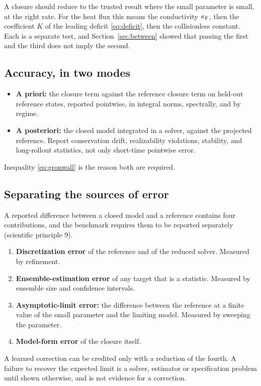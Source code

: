 A closure should reduce to the trusted result where the small parameter is
small, at the right rate. For the heat flux this means the conductivity
$\kappa_{\mathrm F}$, then the coefficient $K$ of the leading deficit
\eqref{eq:deficit}, then the collisionless constant. Each is a separate
test, and Section~\ref{sec:between} showed that passing the first and the
third does not imply the second.

\subsection{Accuracy, in two modes}

\begin{itemize}
  \item \textbf{A priori:} the closure term against the reference closure
    term on held-out reference states, reported pointwise, in integral
    norms, spectrally, and by regime.
  \item \textbf{A posteriori:} the closed model integrated in a solver,
    against the projected reference. Report conservation drift,
    realizability violations, stability, and long-rollout statistics, not
    only short-time pointwise error.
\end{itemize}
Inequality \eqref{eq:gronwall} is the reason both are required.

\subsection{Separating the sources of error}

A reported difference between a closed model and a reference contains
four contributions, and the benchmark requires them to be reported
separately (scientific principle 9).
\begin{enumerate}
  \item \textbf{Discretization error} of the reference and of the reduced
    solver. Measured by refinement.
  \item \textbf{Ensemble-estimation error} of any target that is a
    statistic. Measured by ensemble size and confidence intervals.
  \item \textbf{Asymptotic-limit error:} the difference between the
    reference at a finite value of the small parameter and the limiting
    model. Measured by sweeping the parameter.
  \item \textbf{Model-form error} of the closure itself.
\end{enumerate}
A learned correction can be credited only with a reduction of the fourth.
A failure to recover the expected limit is a solver, estimator or
specification problem until shown otherwise, and is not evidence for a
correction.

